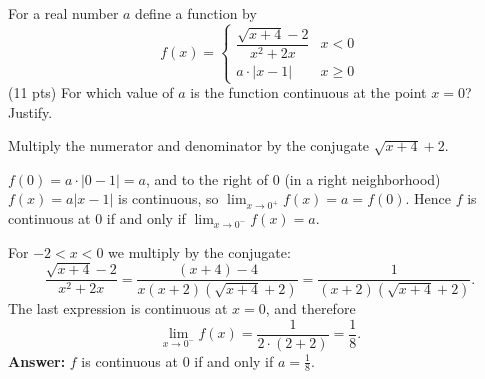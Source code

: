 
\begin{question}
For a real number $a$ define a function by
\[ f(x) = \begin{cases} \dfrac{\sqrt{x+4} - 2}{x^2 + 2x} & x < 0 \\ a\cdot|x - 1| & x \ge 0 \end{cases} \]
(11 pts) For which value of $a$ is the function continuous at the point $x = 0$? Justify.
\end{question}

\begin{hint}
Multiply the numerator and denominator by the conjugate $\sqrt{x+4} + 2$.
\end{hint}

\begin{solution}
$f(0) = a\cdot|0 - 1| = a$, and to the right of $0$ (in a right neighborhood) $f(x) = a|x-1|$ is continuous, so $\lim_{x\to0^+}f(x) = a = f(0)$.
Hence $f$ is continuous at $0$ if and only if $\lim_{x\to 0^-} f(x) = a$.

For $-2 < x < 0$ we multiply by the conjugate:
\[ \frac{\sqrt{x+4} - 2}{x^2 + 2x} = \frac{(x + 4) - 4}{x(x+2)\left(\sqrt{x+4} + 2\right)} = \frac{1}{(x+2)\left(\sqrt{x+4}+2\right)}. \]
The last expression is continuous at $x=0$, and therefore
\[ \lim_{x\to 0^-} f(x) = \frac{1}{2\cdot(2 + 2)} = \frac18. \]
\textbf{Answer:} $f$ is continuous at $0$ if and only if $a = \frac18$.
\end{solution}
